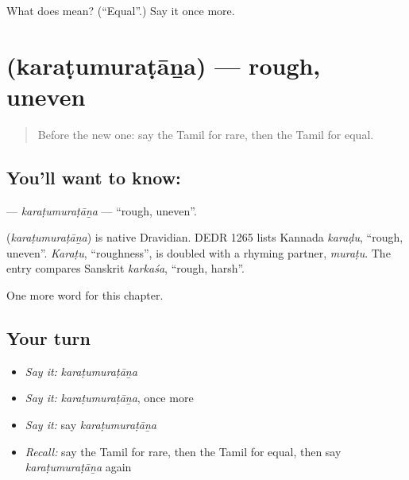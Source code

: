 \begin{tcolorbox}[breakable,colback=teal!4,colframe=teal!35!black,title={Before you move on}]
What does  mean? (\textquotedblleft{}Equal\textquotedblright{}.) Say it once more.
\end{tcolorbox}
\section[\texorpdfstring{\ta{கரடுமுரடான} (karaṭumuraṭāṉa)}{கரடுமுரடான (karaṭumuraṭāṉa)}]{ (karaṭumuraṭāṉa) — rough, uneven}

\label{lesson:TA-C241-karatumuratana}



\begin{quote}
Before the new one: say the Tamil for rare, then the Tamil for equal.
\end{quote}

\subsection*{You'll want to know: }
\textbf{} — \emph{karaṭumuraṭāṉa} — \textquotedblleft{}rough, uneven\textquotedblright{}.

\begin{cousinweb}
\textbf{} (\emph{karaṭumuraṭāṉa}) is native Dravidian. DEDR 1265 lists Kannada \emph{karaḍu}, \textquotedblleft{}rough, uneven\textquotedblright{}. \emph{Karaṭu}, \textquotedblleft{}roughness\textquotedblright{}, is doubled with a rhyming partner, \emph{muraṭu}. The entry compares Sanskrit \emph{karkaśa}, \textquotedblleft{}rough, harsh\textquotedblright{}.
\end{cousinweb}

\begin{grammarlens}[title={What you've built}]
One more word for this chapter.
\end{grammarlens}

\subsection*{Your turn}
\begin{itemize}
\raggedright
  \item \emph{Say it:} \emph{karaṭumuraṭāṉa}
  \item \emph{Say it:} \emph{karaṭumuraṭāṉa}, once more
  \item \emph{Say it:} say \emph{karaṭumuraṭāṉa}
  \item \emph{Recall:} say the Tamil for rare, then the Tamil for equal, then say \emph{karaṭumuraṭāṉa} again
\end{itemize}

